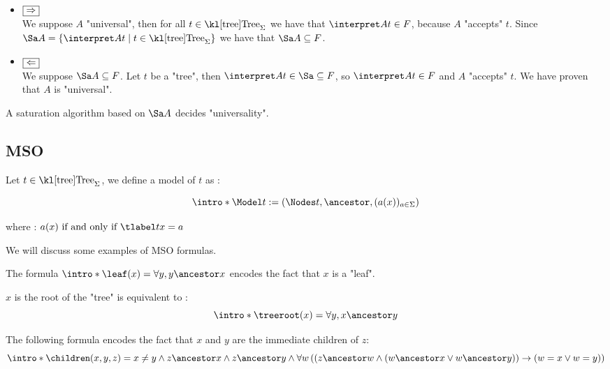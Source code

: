 \documentclass{article}
\begin{document}
\begin{proofI}
	\begin{itemize}
		\item $\fbox{$\Rightarrow$}$\\
		      We suppose $A$ "universal", then for all $t \in \tree_\Sigma$ we have that $\interpret A t \in F$, because $A$ "accepts" $t$.
		      Since $\Sa A = \setdef {\interpret A t} {t\in \tree_\Sigma}$ we have that $\Sa A \subseteq F$.

		\item $\fbox{$\Leftarrow$}$\\
		      We suppose $\Sa A \subseteq F$. Let $t$ be a "tree", then $\interpret A t \in \Sa \subseteq F$, so $\interpret A t \in F$ and $A$
		      "accepts" $t$. We have proven that $A$ is "universal".
	\end{itemize}
\end{proofI}


\begin{coro}\label{coro:univeral-Sa}
	A saturation algorithm based on $\Sa A$ decides "universality".
\end{coro}


\subsection{MSO}

\begin{definition}
	Let $t \in \tree_{\Sigma}$, we define a model of $t$ as :

	\[\intro* \Model t := (\Nodes t, \ancestor , (a (x))_{a \in \Sigma}) \]

	where : $a(x) \tiff \tlabel t x = a$
\end{definition}

We will discuss some examples of MSO formulas.

\begin{example}
	The formula $\intro* \leaf (x) = \forall y,  y \ancestor x$ encodes the fact that $x$ is a "leaf".
\end{example}

\begin{example}
	$x$ is the root of the "tree" is equivalent to :
	\[\intro* \treeroot (x) = \forall y,  x \ancestor y \]
\end{example}

\begin{example}
	The following formula encodes the fact that $x$ and $y$ are the immediate children of $z$:
	\[\intro* \children (x,y,z) =
		x \neq y \land
		z  \ancestor  x \land  z \ancestor y \land
		\forall w
		\left( \left(
			z \ancestor w \land
				(w \ancestor x \lor w \ancestor  y) \right) \rightarrow (
			w = x \lor w = y
			)
		\right) \]
\end{example}
\end{document}
